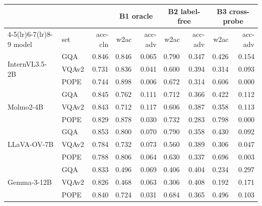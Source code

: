 \footnotesize
\setlength{\tabcolsep}{4pt}
\begin{tabular}{@{}ll r rr rr rr@{}}
\toprule
 &  &  & \multicolumn{2}{c}{B1 oracle} & \multicolumn{2}{c}{B2 label-free} & \multicolumn{2}{c}{B3 cross-probe} \\
\cmidrule(lr){4-5}\cmidrule(lr){6-7}\cmidrule(lr){8-9}
model & set & acc-cln & w2ac & acc-adv & w2ac & acc-adv & w2ac & acc-adv \\
\midrule
\multirow{3}{*}{InternVL3.5-2B} & GQA & 0.846 & 0.846 & 0.065 & 0.790 & 0.347 & 0.426 & 0.154 \\
 & VQAv2 & 0.731 & 0.836 & 0.041 & 0.600 & 0.394 & 0.314 & 0.093 \\
 & POPE & 0.744 & 0.898 & 0.006 & 0.672 & 0.314 & 0.606 & 0.000 \\
\midrule
\multirow{3}{*}{Molmo2-4B} & GQA & 0.845 & 0.762 & 0.111 & 0.712 & 0.366 & 0.422 & 0.112 \\
 & VQAv2 & 0.843 & 0.712 & 0.117 & 0.606 & 0.387 & 0.358 & 0.113 \\
 & POPE & 0.829 & 0.878 & 0.030 & 0.732 & 0.283 & 0.798 & 0.000 \\
\midrule
\multirow{3}{*}{LLaVA-OV-7B} & GQA & 0.853 & 0.800 & 0.070 & 0.790 & 0.358 & 0.430 & 0.092 \\
 & VQAv2 & 0.784 & 0.732 & 0.073 & 0.560 & 0.389 & 0.306 & 0.047 \\
 & POPE & 0.788 & 0.806 & 0.064 & 0.630 & 0.337 & 0.696 & 0.003 \\
\midrule
\multirow{3}{*}{Gemma-3-12B} & GQA & 0.833 & 0.496 & 0.069 & 0.406 & 0.404 & 0.234 & 0.297 \\
 & VQAv2 & 0.826 & 0.468 & 0.063 & 0.306 & 0.408 & 0.192 & 0.171 \\
 & POPE & 0.840 & 0.724 & 0.031 & 0.684 & 0.365 & 0.496 & 0.103 \\
\bottomrule
\end{tabular}

